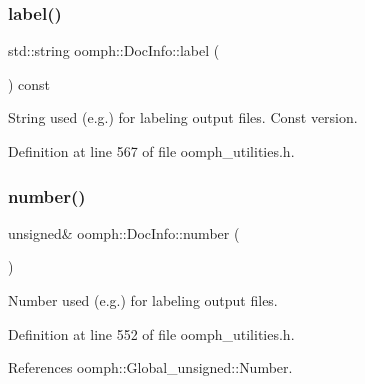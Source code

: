 \mbox{\label{classoomph_1_1DocInfo_a1814ba7e28fadb03a8a5387103ec38a2}} 
\subsubsection{\texorpdfstring{label()}{label()}\hspace{0.1cm}{\footnotesize\ttfamily [2/2]}}
{\footnotesize\ttfamily std\+::string oomph\+::\+Doc\+Info\+::label (\begin{DoxyParamCaption}{ }\end{DoxyParamCaption}) const\hspace{0.3cm}{\ttfamily [inline]}}



String used (e.\+g.) for labeling output files. Const version. 



Definition at line 567 of file oomph\+\_\+utilities.\+h.

\mbox{\label{classoomph_1_1DocInfo_af27224b25da5b758442753f0947e62d4}} 
\subsubsection{\texorpdfstring{number()}{number()}\hspace{0.1cm}{\footnotesize\ttfamily [1/2]}}
{\footnotesize\ttfamily unsigned\& oomph\+::\+Doc\+Info\+::number (\begin{DoxyParamCaption}{ }\end{DoxyParamCaption})\hspace{0.3cm}{\ttfamily [inline]}}



Number used (e.\+g.) for labeling output files. 



Definition at line 552 of file oomph\+\_\+utilities.\+h.



References oomph\+::\+Global\+\_\+unsigned\+::\+Number.



